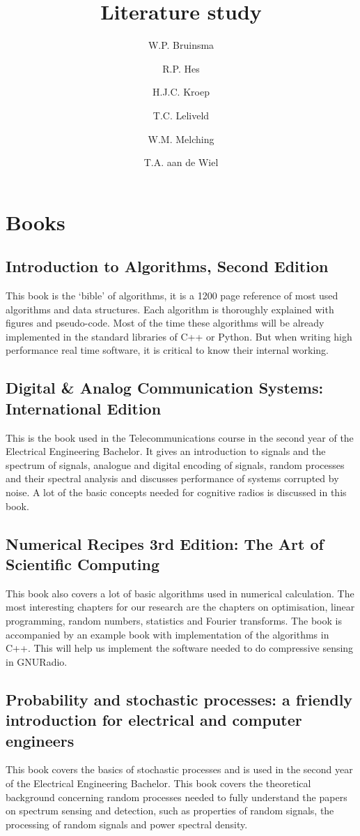 \documentclass[report, oneside, a4paper, openany]{memoir}
\title{Literature study}
\author{W.P. Bruinsma \and R.P. Hes \and H.J.C. Kroep \and T.C. Leliveld \and W.M. Melching \and T.A. aan de Wiel}
\begin{document}
\chapter{Books}

\section{Introduction to Algorithms, Second Edition \cite{cormen2001introduction}}
This book is the `bible' of algorithms, it is a 1200 page reference of most used algorithms and data structures. Each algorithm is thoroughly explained with figures and pseudo-code. Most of the time these algorithms will be already implemented in the standard libraries of C++ or Python. But when writing high performance real time software, it is critical to know their internal working.
\section{Digital \& Analog Communication Systems: International Edition \cite{couch2013digital}}
This is the book used in the Telecommunications course in the second year of the Electrical Engineering Bachelor. It gives an introduction to signals and the spectrum of signals, analogue and digital encoding of signals, random processes and their spectral analysis and discusses performance of systems corrupted by noise. A lot of the basic concepts needed for cognitive radios is discussed in this book. 
\section{Numerical Recipes 3rd Edition: The Art of Scientific Computing \cite{press2007numerical}}
This book also covers a lot of basic algorithms used in numerical calculation. The most interesting chapters for our research are the chapters on optimisation, linear programming, random numbers, statistics and Fourier transforms.  The book is accompanied by an example book with implementation of the algorithms in C++. This will help us implement the software needed to do compressive sensing in GNURadio.
\section{Probability and stochastic processes: a friendly introduction for electrical and computer engineers \cite{yates2005probability}}
This book covers the basics of stochastic processes and is used in the second year of the Electrical Engineering Bachelor. This book covers the theoretical background concerning random processes needed to fully understand the papers on spectrum sensing and detection, such as properties of random signals, the processing of random signals and power spectral density.
\end{document}
